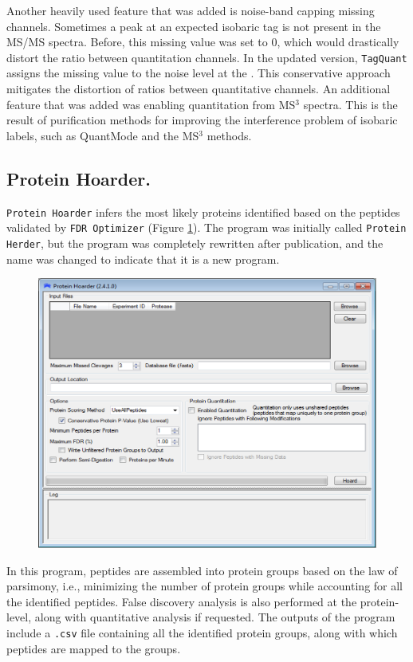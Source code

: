 Another heavily used feature that was added is noise-band capping missing channels. Sometimes a peak at an expected isobaric tag \mz{} is not present in the MS/MS spectra. Before, this missing value was set to $0$, which would drastically distort the ratio between quantitation channels. In the updated version, \texttt{TagQuant} assigns the missing value to the noise level at the \mz{}. This conservative approach mitigates the distortion of ratios between quantitative channels. An additional feature that was added was enabling quantitation from MS$^3$ spectra. This is the result of purification methods for improving the interference problem of isobaric labels, such as QuantMode and the MS$^3$ methods.\cite{quantmode,ms3}

\subsection*{Protein Hoarder.}
\texttt{Protein Hoarder} infers the most likely proteins identified based on the peptides validated by \texttt{FDR Optimizer} (Figure \ref{fig:hoarder}). The program was initially called \texttt{Protein Herder}, but the program was completely rewritten after publication, and the name was changed to indicate that it is a new program.
\begin{figure}[p]
	\centering
	\includegraphics[width=\columnwidth]{csmsl/proteinhoarder.png}
	\label{fig:hoarder}
\end{figure}
In this program, peptides are assembled into protein groups based on the law of parsimony, i.e., minimizing the number of protein groups while accounting for all the identified peptides. False discovery analysis is also performed at the protein-level, along with quantitative analysis if requested. The outputs of the program include a \texttt{.csv} file containing all the identified protein groups, along with which peptides are mapped to the groups.


